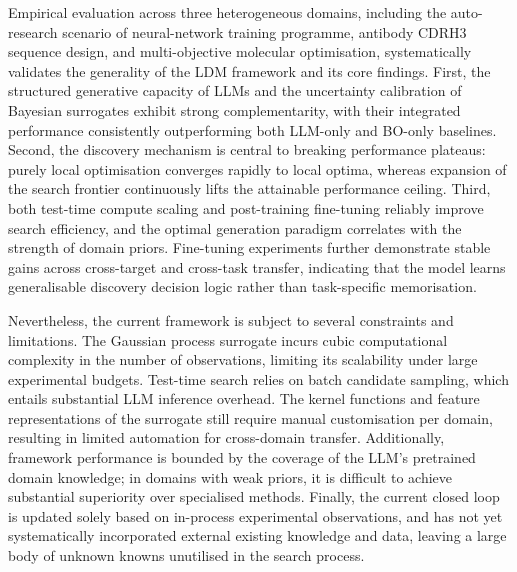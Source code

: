 Empirical evaluation across three heterogeneous domains, including the auto-research scenario of neural-network training programme, antibody CDRH3 sequence design, and multi-objective molecular optimisation, systematically validates the generality of the LDM framework and its core findings. First, the structured generative capacity of LLMs and the uncertainty calibration of Bayesian surrogates exhibit strong complementarity, with their integrated performance consistently outperforming both LLM-only and BO-only baselines. Second, the discovery mechanism is central to breaking performance plateaus: purely local optimisation converges rapidly to local optima, whereas expansion of the search frontier continuously lifts the attainable performance ceiling. Third, both test-time compute scaling and post-training fine-tuning reliably improve search efficiency, and the optimal generation paradigm correlates with the strength of domain priors. Fine-tuning experiments further demonstrate stable gains across cross-target and cross-task transfer, indicating that the model learns generalisable discovery decision logic rather than task-specific memorisation.

Nevertheless, the current framework is subject to several constraints and limitations. The Gaussian process surrogate incurs cubic computational complexity in the number of observations, limiting its scalability under large experimental budgets. Test-time search relies on batch candidate sampling, which entails substantial LLM inference overhead. The kernel functions and feature representations of the surrogate still require manual customisation per domain, resulting in limited automation for cross-domain transfer. Additionally, framework performance is bounded by the coverage of the LLM’s pretrained domain knowledge; in domains with weak priors, it is difficult to achieve substantial superiority over specialised methods. Finally, the current closed loop is updated solely based on in-process experimental observations, and has not yet systematically incorporated external existing knowledge and data, leaving a large body of unknown knowns unutilised in the search process.

